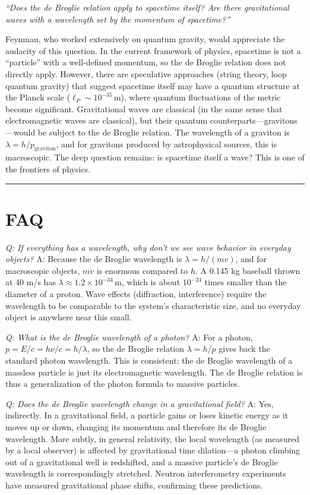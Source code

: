 \documentclass[11pt,openright]{book}
\begin{document}
\textit{``Does the de Broglie relation apply to spacetime itself? Are there gravitational waves with a wavelength set by the momentum of spacetime?''}

Feynman, who worked extensively on quantum gravity, would appreciate the audacity of this question. In the current framework of physics, spacetime is not a ``particle'' with a well-defined momentum, so the de Broglie relation does not directly apply. However, there are speculative approaches (string theory, loop quantum gravity) that suggest spacetime itself may have a quantum structure at the Planck scale ($\ell_P \sim 10^{-35}\,\text{m}$), where quantum fluctuations of the metric become significant. Gravitational waves are classical (in the same sense that electromagnetic waves are classical), but their quantum counterparts---gravitons---would be subject to the de Broglie relation. The wavelength of a graviton is $\lambda = h/p_{\text{graviton}}$, and for gravitons produced by astrophysical sources, this is macroscopic. The deep question remains: is spacetime itself a wave? This is one of the frontiers of physics.

\bigskip
\hrule
\bigskip
\section*{FAQ}

\textit{Q: If everything has a wavelength, why don't we see wave behavior in everyday objects?}
A: Because the de Broglie wavelength is $\lambda = h/(mv)$, and for macroscopic objects, $mv$ is enormous compared to $h$. A 0.145 kg baseball thrown at 40 m/s has $\lambda \approx 1.2\times 10^{-34}\,\text{m}$, which is about $10^{-24}$ times smaller than the diameter of a proton. Wave effects (diffraction, interference) require the wavelength to be comparable to the system's characteristic size, and no everyday object is anywhere near this small.

\textit{Q: What is the de Broglie wavelength of a photon?}
A: For a photon, $p = E/c = h\nu/c = h/\lambda$, so the de Broglie relation $\lambda = h/p$ gives back the standard photon wavelength. This is consistent: the de Broglie wavelength of a massless particle is just its electromagnetic wavelength. The de Broglie relation is thus a generalization of the photon formula to massive particles.

\textit{Q: Does the de Broglie wavelength change in a gravitational field?}
A: Yes, indirectly. In a gravitational field, a particle gains or loses kinetic energy as it moves up or down, changing its momentum and therefore its de Broglie wavelength. More subtly, in general relativity, the local wavelength (as measured by a local observer) is affected by gravitational time dilation---a photon climbing out of a gravitational well is redshifted, and a massive particle's de Broglie wavelength is correspondingly stretched. Neutron interferometry experiments have measured gravitational phase shifts, confirming these predictions.
\end{document}
